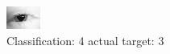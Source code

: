 \begin{figure}[h!]
\begin{center}
\includegraphics[width=0.60\columnwidth]{figures/ID129_class_4_target_3.png}
\end{center}
\caption{ Classification: 4 actual target: 3}
\label{fig:ID129_class_4_target_3}
\end{figure}
